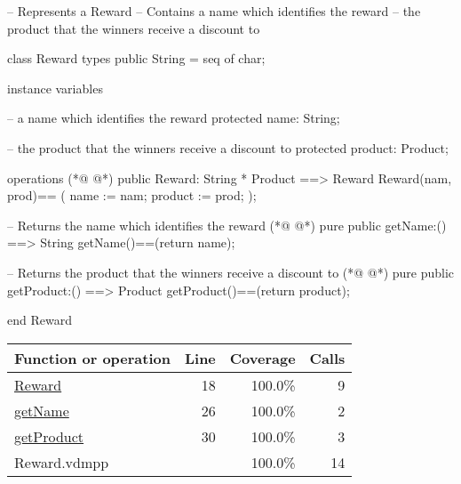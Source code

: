\begin{vdmpp}[breaklines=true]
-- Represents a Reward
-- Contains a name which identifies the reward
--      the product that the winners receive a discount to

class Reward
 types
  public String = seq of char;
  
 instance variables
 
   -- a name which identifies the reward
  protected name: String;
  
  -- the product that the winners receive a discount to
   protected product: Product;
    
  operations 
(*@
\label{Reward:18}
@*)
   public Reward: String * Product ==> Reward
     Reward(nam, prod)==
     (
     name := nam;
     product := prod;
     );
   
  -- Returns the name which identifies the reward
(*@
\label{getName:26}
@*)
   pure public getName:() ==> String
   getName()==(return name);
   
   -- Returns the product that the winners receive a discount to
(*@
\label{getProduct:30}
@*)
   pure public getProduct:() ==> Product
   getProduct()==(return product);
  

   
end Reward
\end{vdmpp}
\bigskip
\begin{longtable}{|l|r|r|r|}
\hline
Function or operation & Line & Coverage & Calls \\
\hline
\hline
\hyperref[Reward:18]{Reward} & 18&100.0\% & 9 \\
\hline
\hyperref[getName:26]{getName} & 26&100.0\% & 2 \\
\hline
\hyperref[getProduct:30]{getProduct} & 30&100.0\% & 3 \\
\hline
\hline
Reward.vdmpp & & 100.0\% & 14 \\
\hline
\end{longtable}

